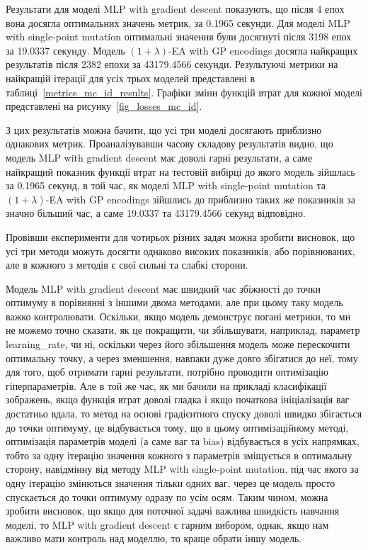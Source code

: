 Результати для моделі MLP with gradient descent показують, що після 4 епох вона досягла оптимальних значень метрик, за 0.1965 секунди. Для моделі MLP with single-point mutation оптимальні значення були досягнуті після 3198 епох за 19.0337 секунду. Модель $(1+\lambda)$-EA with GP encodings досягла найкращих результатів після 2382 епохи за 43179.4566 секунди. Результуючі метрики на найкращій ітерації для усіх трьох моделей представлені в таблиці~\ref{metrics_mc_id_results}. Графіки зміни функцій втрат для кожної моделі представлені на рисунку~\ref{fig_losses_mc_id}.

З цих результатів можна бачити, що усі три моделі досягають приблизно однакових метрик. Проаналізувавши часову складову результатів видно, що модель MLP with gradient descent має доволі гарні результати, а саме найкращий показник функції втрат на тестовій вибірці до якого модель зійшлась за 0.1965 секунд, в той час, як моделі MLP with single-point mutation та $(1+\lambda)$-EA with GP encodings зійшлись до приблизно таких же показників за значно більший час, а саме 19.0337 та 43179.4566 секунд відповідно.

Провівши експерименти для чотирьох різних задач можна зробити висновок, що усі три методи можуть досягти однаково високих показників, або порівнюваних, але в кожного з методів є свої сильні та слабкі сторони. 

Модель MLP with gradient descent має швидкий час збіжності до точки оптимуму в порівнянні з іншими двома методами, але при цьому таку модель важко контролювати. Оскільки, якщо модель демонструє погані метрики, то ми не можемо точно сказати, як це покращити, чи збільшувати, наприклад, параметр learning\_rate, чи ні, оскільки через його збільшення модель може перескочити оптимальну точку, а через зменшення, навпаки дуже довго збігатися до неї, тому для того, щоб отримати гарні результати, потрібно проводити оптимізацію гіперпараметрів. Але в той же час, як ми бачили на прикладі класифікації зображень, якщо функція втрат доволі гладка і якщо початкова ініціалізація ваг достатньо вдала, то метод на основі градієнтного спуску доволі швидко збігається до точки оптимуму, це відбувається тому, що в цьому оптимізаційному методі, оптимізація параметрів моделі (а саме ваг та bias) відбувається в усіх напрямках, тобто за одну ітерацію значення кожного з параметрів зміщується в оптимальну сторону, навідмінну від методу MLP with single-point mutation, під час якого за одну ітерацію змінються значення тільки одних ваг, через це модель просто спускається до точки оптимуму одразу по усім осям. Таким чином, можна зробити висновок, що якщо для поточної задачі важлива швидкість навчання моделі, то MLP with gradient descent є гарним вибором, однак, якщо нам важливо мати контроль над моделлю, то краще обрати іншу модель.

